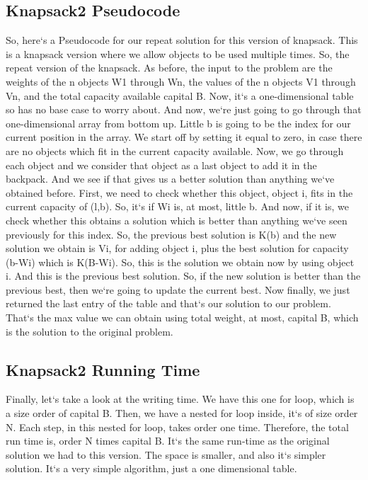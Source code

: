 \subsection{Knapsack2  Pseudocode}
So, here`s a Pseudocode for our repeat solution for this version of knapsack.
This is a knapsack version where we allow objects to be used multiple times.
So, the repeat version of the knapsack.
As before, the input to the problem are the weights of the n objects W1 through Wn, the values of the n objects V1 through Vn, and the total capacity available capital B\@.
Now, it`s a one-dimensional table so has no base case to worry about.
And now, we`re just going to go through that one-dimensional array from bottom up.
Little b is going to be the index for our current position in the array.
We start off by setting it equal to zero, in case there are no objects which fit in the current capacity available.
Now, we go through each object and we consider that object as a last object to add it in the backpack.
And we see if that gives us a better solution than anything we`ve obtained before.
First, we need to check whether this object, object i, fits in the current capacity of (l,b).
So, it`s if Wi is, at most, little b.
And now, if it is, we check whether this obtains a solution which is better than anything we`ve seen previously for this index.
So, the previous best solution is K(b) and the new solution we obtain is Vi, for adding object i, plus the best solution for capacity (b-Wi) which is K(B-Wi).
So, this is the solution we obtain now by using object i.
And this is the previous best solution.
So, if the new solution is better than the previous best, then we`re going to update the current best.
Now finally, we just returned the last entry of the table and that`s our solution to our problem.
That`s the max value we can obtain using total weight, at most, capital B, which is the solution to the original problem.

\subsection{Knapsack2  Running Time}
Finally, let`s take a look at the writing time.
We have this one for loop, which is a size order of capital B\@.
Then, we have a nested for loop inside, it`s of size order N\@.
Each step, in this nested for loop, takes order one time.
Therefore, the total run time is, order N times capital B\@.
It`s the same run-time as the original solution we had to this version.
The space is smaller, and also it`s simpler solution.
It`s a very simple algorithm, just a one dimensional table.

